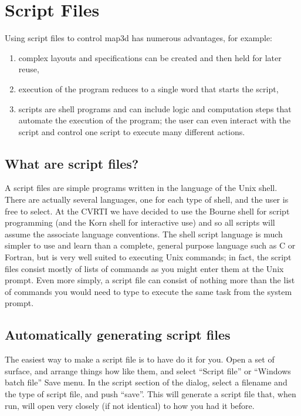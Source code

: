 \section{Script Files}
\label{sec:scripts} 

Using script files to control map3d has numerous advantages, for example:

\begin{enumerate}
  \item complex layouts and specifications can be created and then held
        for later reuse,
  \item execution of the program reduces to a single word that starts the
        script,
  \item scripts are shell programs and can include logic and computation
        steps that automate the execution of the program; the user can even
        interact with the script and control one script to execute many
        different actions.
\end{enumerate}

\subsection{What are script files?}

A script files are simple programs written in the language of the Unix
shell.  There are actually several languages, one for each type of shell,
and the user is free to select.  At the CVRTI we have decided to use the
Bourne shell for script programming (and the Korn shell for interactive
use) and so all scripts will assume the associate language conventions.
The shell script language is much simpler to use and learn than a complete,
general purpose language such as C or Fortran, but is very well suited to
executing Unix commands; in fact, the script files consist mostly of lists
of commands as you might enter them at the Unix prompt.  Even more simply,
a script file can consist of nothing more than the list of commands you
would need to type to execute the same task from the system prompt.

\subsection{Automatically generating script files}
The easiest way to make a script file is to have \map{} do it for you.  Open a set
of surface, and arrange things how like them, and select ``Script file'' or ``Windows batch file'' 
Save menu.
In the script section of the dialog, select a filename and the type of script file, and 
push ``save''.  This will generate a script file that, when run, will open \map{} very closely
(if not identical) to how you had it before.

